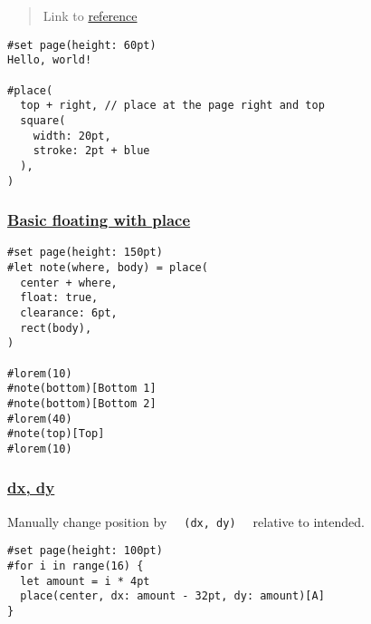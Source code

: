 \begin{quote}
Link to \href{https://typst.app/docs/reference/layout/place/}{reference}
\end{quote}

\begin{verbatim}
#set page(height: 60pt)
Hello, world!

#place(
  top + right, // place at the page right and top
  square(
    width: 20pt,
    stroke: 2pt + blue
  ),
)
\end{verbatim}

\pandocbounded{}

\subsubsection{\texorpdfstring{\hyperref[basic-floating-with-place]{Basic
floating with
place}}{Basic floating with place}}\label{basic-floating-with-place}

\begin{verbatim}
#set page(height: 150pt)
#let note(where, body) = place(
  center + where,
  float: true,
  clearance: 6pt,
  rect(body),
)

#lorem(10)
#note(bottom)[Bottom 1]
#note(bottom)[Bottom 2]
#lorem(40)
#note(top)[Top]
#lorem(10)
\end{verbatim}

\pandocbounded{}

\pandocbounded{}

\subsubsection{\texorpdfstring{\hyperref[dx-dy]{dx,
dy}}{dx, dy}}\label{dx-dy}

Manually change position by
\texttt{\ }{\texttt{\ (dx,\ dy)\ }}\texttt{\ } relative to intended.

\begin{verbatim}
#set page(height: 100pt)
#for i in range(16) {
  let amount = i * 4pt
  place(center, dx: amount - 32pt, dy: amount)[A]
}
\end{verbatim}

\pandocbounded{}

